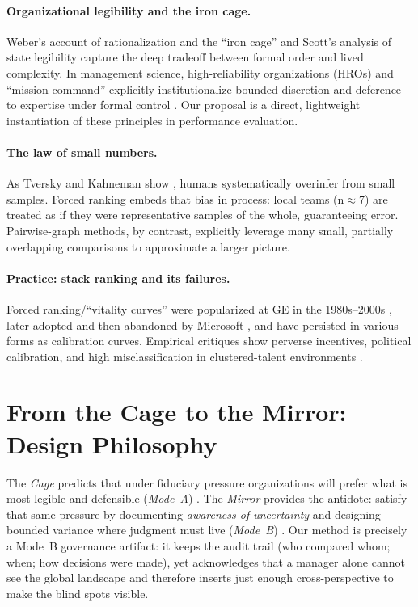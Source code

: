 \documentclass[11pt]{article}
\begin{document}
\paragraph{Organizational legibility and the iron cage.} Weber's account of rationalization and the ``iron cage'' \citep{weber1905} and Scott's analysis of state legibility \citep{scott1998seeing} capture the deep tradeoff between formal order and lived complexity. In management science, high-reliability organizations (HROs) and ``mission command'' explicitly institutionalize bounded discretion and deference to expertise under formal control \citep{weick2007managing,adp6-0}. Our proposal is a direct, lightweight instantiation of these principles in performance evaluation.\\

\paragraph{The law of small numbers.} As Tversky and Kahneman show \citep{tversky1971law}, humans systematically overinfer from small samples. Forced ranking embeds that bias in process: local teams (n$\approx$7) are treated as if they were representative samples of the whole, guaranteeing error. Pairwise-graph methods, by contrast, explicitly leverage many small, partially overlapping comparisons to approximate a larger picture.

\paragraph{Practice: stack ranking and its failures.} Forced ranking/``vitality curves'' were popularized at GE in the 1980s--2000s \citep{grote2005}, later adopted and then abandoned by Microsoft \citep{forbes2013-msft}, and have persisted in various forms as calibration curves. Empirical critiques show perverse incentives, political calibration, and high misclassification in clustered-talent environments \citep{jeremy2025-rank}.

\section{From the Cage to the Mirror: Design Philosophy}
The \emph{Cage} predicts that under fiduciary pressure organizations will prefer what is most legible and defensible (\emph{Mode~A}) \citep{jeremy2025-cage}. The \emph{Mirror} provides the antidote: satisfy that same pressure by documenting \emph{awareness of uncertainty} and designing bounded variance where judgment must live (\emph{Mode~B}) \citep{jeremy2025-mirror}. Our method is precisely a Mode~B governance artifact: it keeps the audit trail (who compared whom; when; how decisions were made), yet acknowledges that a manager alone cannot see the global landscape and therefore inserts just enough cross-perspective to make the blind spots visible.
\end{document}
